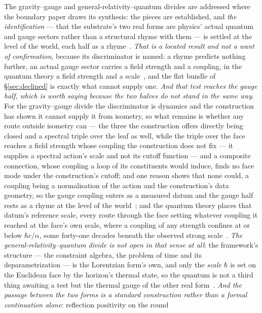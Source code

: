 \documentclass[11pt,a4paper]{article}
\theoremstyle{plain}
\theoremstyle{definition}
\begin{document}
The gravity--gauge and general-relativity--quantum divides are addressed where the boundary paper draws its
synthesis: the pieces are established, and \emph{the identification} --- that the substrate's two real forms are
physics' actual quantum and gauge sectors rather than a structural rhyme with them --- is settled at the level of
the world, each half as a rhyme~\cite{JanzenBoundary}. \emph{That is a located result and not a want of
confirmation}, because its discriminator is named: a rhyme predicts nothing further, an actual gauge sector carries a field strength and
a coupling, in the quantum theory a field strength and a scale~\cite{JanzenMatter}, and the flat bundle of \S\ref{sec:declined} is exactly what cannot supply one.
\emph{And that test reaches the gauge half, which is worth saying because the two halves do not stand in the
same way.} For the gravity--gauge divide the discriminator is dynamics and the construction has shown it
cannot supply it from isometry, so what remains is whether any route outside isometry can --- the three the construction offers directly being closed and a spectral triple over the leaf as well, while the triple over the face reaches a field strength whose coupling the construction does not fix --- it supplies a spectral action's scale and not its cutoff function --- and a composite connection, whose coupling a loop of its constituents would induce, finds no face mode under the construction's cutoff; and one reason shows that none could, a coupling being a normalisation of the action and the construction's data geometry, so the gauge coupling enters as a measured datum and the gauge half rests as a rhyme at the level of the world~\cite{JanzenBoundary}; and the quantum theory places that datum's reference scale, every route through the face setting whatever coupling it reached at the face's own scale, where a coupling of any strength confines at or below $\hbar c/\alpha$, some forty-one decades beneath the observed strong scale~\cite{JanzenBoundary,JanzenMatter}. \emph{The
general-relativity--quantum divide is not open in that sense at all}: the framework's structure --- the
constraint algebra, the problem of time and its deparametrization --- is the Lorentzian form's own, and only
the \emph{scale} $\hbar$ is set on the Euclidean face by the horizon's thermal state, so the quantum is not a
third thing awaiting a test but the thermal gauge of the other real form~\cite{JanzenBoundary}. \emph{And the passage between
the two forms is a standard construction rather than a formal continuation alone}: reflection positivity on the round
\end{document}
